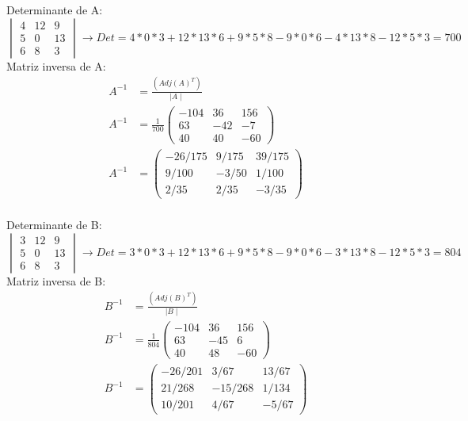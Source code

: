 \documentclass{article}
\begin{document}
\begin{enumerate}
Determinante de A:
\begin{equation*}
   \begin{vmatrix}
    4 & 12 & 9 \\
    5 & 0 & 13 \\
    6 & 8 & 3
   \end{vmatrix}    \rightarrow Det=
    4*0*3+12*13*6+9*5*8-9*0*6-4*13*8-12*5*3= 700
\end{equation*}
Matriz inversa de A:
\begin{equation*}
\begin{split}
    A^{-1} &= \frac{(Adj(A)^{T})}{\mid A \mid}\\
    A^{-1} &= \frac{1}{700} \left(
    \begin{array}{ccc}
    -104 & 36 & 156 \\
    63 & -42 & -7 \\
    40 & 40 & -60
    \end{array}
    \right)\\
    A^{-1} &=  \left(
    \begin{array}{ccc}
    -26/175 & 9/175 & 39/175 \\
    9/100 & -3/50 & 1/100 \\
    2/35 & 2/35 & -3/35
    \end{array}
    \right)\\
\end{split}
\end{equation*}

Determinante de B:
\begin{equation*}
    \begin{vmatrix}
    3 & 12 & 9 \\
    5 & 0 & 13 \\
    6 & 8 & 3 
    \end{vmatrix}    \rightarrow Det=
    3*0*3+12*13*6+9*5*8-9*0*6-3*13*8-12*5*3= 804
\end{equation*}
Matriz inversa de B:
\begin{equation*}
\begin{split}
    B^{-1} &= \frac{(Adj(B)^{T})}{\mid B \mid}\\
    B^{-1} &= \frac{1}{804} \left(
    \begin{array}{ccc}
    -104 & 36 & 156 \\
    63 & -45 & 6 \\
    40 & 48 & -60
    \end{array}
    \right)\\
    B^{-1} &=  \left(
    \begin{array}{ccc}
    -26/201 & 3/67 & 13/67 \\
    21/268 & -15/268 & 1/134 \\
    10/201 & 4/67 & -5/67
    \end{array}
    \right)\\
\end{split}
\end{equation*}


\end{enumerate}
\end{document}
